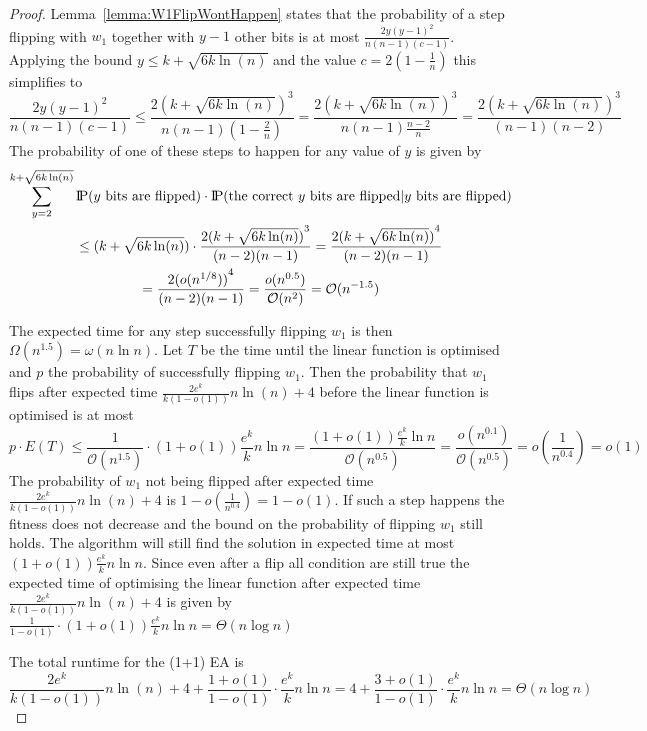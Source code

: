\begin{proof}
    Lemma~\ref{lemma:W1FlipWontHappen} states that the probability of a step flipping with $w_1$ together with $y-1$ other bits is at most $\frac{2y{(y-1)}^2}{n(n-1)(c-1)}$.
    Applying the bound $y\le k+\sqrt{6k\ln(n)}$ and the value $c=2(1-\frac{1}{n})$ this simplifies to
    \[
        \frac{2y{(y-1)}^2}{n(n-1)(c-1)}
        \le\frac{2{(k+\sqrt{6k\ln(n)})}^3}{n(n-1)(1-\frac{2}{n})}
        =\frac{2{(k+\sqrt{6k\ln(n)})}^3}{n(n-1)\frac{n-2}{n}}
        =\frac{2{(k+\sqrt{6k\ln(n)})}^3}{(n-1)(n-2)}
    \]
    The probability of one of these steps to happen for any value of $y$ is given by
    \begin{gather}
        \nonumber \sum_{y=2}^{k+\sqrt{6k\ln(n)}}{\text{I\kern-0.15em P}(y \text{ bits are flipped})\cdot\text{I\kern-0.15em P}(\text{the correct $y$ bits are flipped} | y \text{ bits are flipped})}\\
        \nonumber \le ({k+\sqrt{6k\ln(n)}})\cdot\frac{2{(k+\sqrt{6k\ln(n)})}^{3}}{(n-2)(n-1)}
        = \frac{2{(k+\sqrt{6k\ln(n)})}^{4}}{(n-2)(n-1)}\\ \nonumber
        = \frac{2{(o({n}^{1/8}))}^{4}}{(n-2)(n-1)}
        = \frac{o(n^{0.5})}{\mathcal{O}(n^{2})}
        = \mathcal{O}(n^{-1.5})
    \end{gather}

    The expected time for any step successfully flipping $w_1$ is then $\Omega(n^{1.5})=\omega(n\ln n)$.
    Let $T$ be the time until the linear function is optimised and $p$ the probability of successfully flipping $w_1$.
    Then the probability that $w_1$ flips after expected time $\frac{2e^k}{k(1-o(1))}n\ln(n)+4$ before the linear function is optimised is at most
    \[
        p\cdot E(T) \le \frac{1}{\mathcal{O}(n^{1.5})}\cdot(1+o(1))\frac{e^k}{k}n\ln n
        =\frac{(1+o(1))\frac{e^k}{k}\ln n}{\mathcal{O}(n^{0.5})}
        =\frac{o(n^{0.1})}{\mathcal{O}(n^{0.5})}
        =o(\frac{1}{n^{0.4}})=o(1)\]
    The probability of $w_1$ not being flipped after expected time $\frac{2e^k}{k(1-o(1))}n\ln(n)+4$ is \(1-o(\frac{1}{n^{0.4}})=1-o(1)\).
    If such a step happens the fitness does not decrease and the bound on the probability of flipping $w_1$ still holds.
    The algorithm will still find the solution in expected time at most $(1+o(1))\frac{e^k}{k}n\ln n$.
    Since even after a flip all condition are still true the expected time of optimising the linear function after expected time $\frac{2e^k}{k(1-o(1))}n\ln(n)+4$ is given by \(\frac{1}{1-o(1)}\cdot(1+o(1))\frac{e^k}{k}n\ln n=\Theta(n\log{}n)\)

    The total runtime for the (1+1) EA is
    \[
        \frac{2e^k}{k(1-o(1))}n\ln(n)+4 + \frac{1+o(1)}{1-o(1)}\cdot \frac{e^k}{k}n\ln n
        = 4+\frac{3+o(1)}{1-o(1)}\cdot \frac{e^k}{k}n\ln n
        =\Theta(n\log{}n)
    \]

\end{proof}

